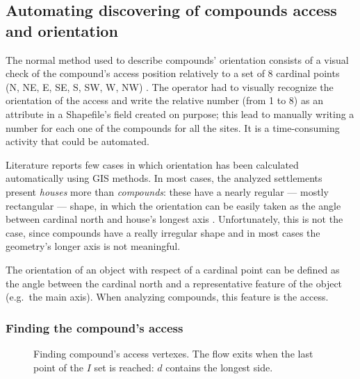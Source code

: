         \subsection{Automating discovering of compounds access and orientation\label{sec:orientation}}

            The normal method used to describe compounds' orientation consists of a visual check of the compound's access position relatively to a set of 8 cardinal points (N, NE, E, SE, S, SW, W, NW) \cite{laterza}. The operator had to visually recognize the orientation of the access and write the relative number (from 1 to 8) as an attribute in a Shapefile's field created on purpose; this lead to manually writing a number for each one of the compounds for all the sites. It is a time-consuming activity that could be automated.

            Literature reports few cases in which orientation has been calculated automatically using GIS methods. In most cases, the analyzed settlements present \emph{houses} more than \emph{compounds}: these have a nearly regular --- mostly rectangular --- shape, in which the orientation can be easily taken as the angle between cardinal north and house's longest axis \cite[p.~53]{spatial-south-europe}. Unfortunately, this is not the case, since compounds have a really irregular shape and in most cases the geometry's longer axis is not meaningful.

            The orientation of an object with respect of a cardinal point can be defined as the angle between the cardinal north and a representative feature of the object (e.g.\ the main axis). When analyzing compounds, this feature is the access.

            \subsubsection{Finding the compound's access}

                \begin{wrapfigure}{r}{0.45\textwidth}
                    \vspace{-0.08\textheight}
                    \centering
                    \begin{tikzpicture}[x=1mm,y=1mm,scale=0.005]
                        
                    \end{tikzpicture}
                    \caption[Logic process to determine the compound's access.]{Finding compound's access vertexes. The flow exits when the last point of the $I$ set is reached: $d$ contains the longest side.}
                    \label{fig:flow-access}
                    \vspace{-0.04\textheight}
                \end{wrapfigure}

